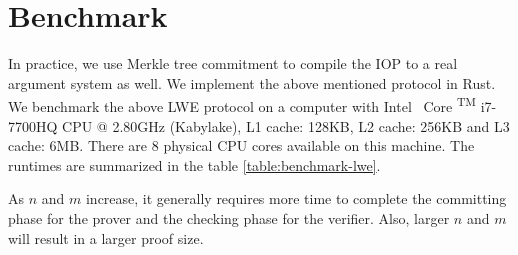 \section{Benchmark}

In practice, we use Merkle tree commitment to compile the IOP to a real argument system as well. We implement the above mentioned protocol in Rust. We benchmark the above LWE protocol on a computer with
Intel \textregistered \, Core  \textsuperscript{TM} i7-7700HQ CPU @ 2.80GHz (Kabylake), L1 cache: 128KB, L2 cache: 256KB and L3 cache: 6MB. There are 8 physical CPU cores available on this machine. The runtimes are summarized in the table \ref{table:benchmark-lwe}.


As $n$ and $m$ increase, it generally requires more time to complete
the committing phase for the prover and the checking phase for the verifier. Also, larger $n$ and $m$ will result in a larger proof size.




